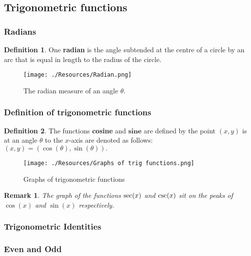 \documentclass[12pt, a4paper]{article}
\newtheorem*{remark}{Remark}
\theoremstyle{definition}
\newtheorem{definition}{Definition}[section]
\theoremstyle{plain}
\begin{document}
\subsection{Trigonometric functions}

\subsubsection{Radians}

\begin{definition}
One \textbf{radian} is the angle subtended at the centre of a circle by an arc that is equal in length to the radius of the circle.
\end{definition}

\begin{figure}[H]
\centering
\texttt{[image: ./Resources/Radian.png]}
\caption{The radian measure of an angle $\theta.$}
\label{fig:radian}
\end{figure}

\subsubsection{Definition of trigonometric functions}

\begin{definition}
The functions \textbf{cosine} and $\textbf{sine}$ are defined by the point $(x,y)$ is at an angle $\theta$ to the $x$-axis are denoted as follows: $(x,y)=(\cos(\theta),\sin(\theta)).$
\end{definition}

\begin{figure}[H]
\centering
\texttt{[image: ./Resources/Graphs of trig functions.png]}
\caption{Graphs of trigonometric functions}
\label{fig:trig functions}
\end{figure}

\begin{remark}
The graph of the functions $\secant(x)$ and $\cosecant(x)$ sit on the peaks of $\cos(x)$ and $\sin(x)$ respectively.
\end{remark}

\subsubsection{Trigonometric Identities}

\subsubsection*{Even and Odd}
\end{document}
